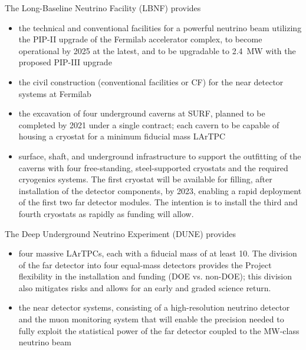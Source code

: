 The Long-Baseline Neutrino Facility (LBNF) provides
\begin{itemize}

\item  the  technical and conventional facilities for a powerful  neutrino beam utilizing the PIP-II upgrade of the Fermilab accelerator 
complex, to become operational by 2025 
at the latest, and to be upgradable to \SI{2.4}{\MW} with the proposed 
PIP-III upgrade

\item  the civil construction (conventional facilities or CF) for the near detector systems at Fermilab 

\item the excavation of four underground caverns at SURF, planned to be completed 
by 2021 under a single contract; each cavern to be capable of housing a cryostat for
a minimum  fiducial mass LArTPC


\item surface, shaft, and underground infrastructure to support 
the outfitting of the caverns with four free-standing, steel-supported cryostats 
and the required cryogenics systems. The first cryostat will be available for filling, after installation of the detector components, by
2023, enabling a rapid deployment of the first two  far detector modules. 
The intention is to install the third and fourth cryostats as rapidly as funding will 
allow.

\end{itemize}

The Deep Underground Neutrino Experiment (DUNE) provides
\begin{itemize}

\item four massive LArTPCs, each with a fiducial mass of at least \SI{10}{\kt}. The division of 
the far detector into four equal-mass detectors provides the Project flexibility 
in the installation and funding (DOE vs. non-DOE); this division also mitigates risks and allows for an early and graded science return.

\item the near detector systems, consisting of a high-resolution neutrino detector 
and the muon monitoring system that will enable %
the precision %
needed to fully 
exploit the statistical power of the %
far detector coupled to the %
MW-class 
neutrino beam
\end{itemize}


